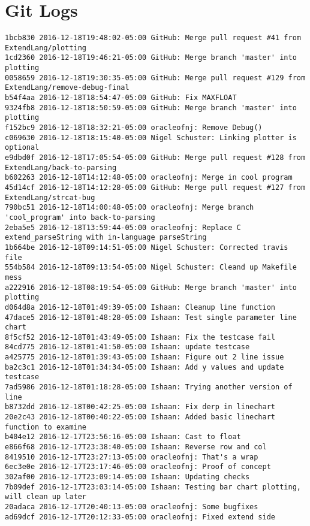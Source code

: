\medskip \noindent
\chapter{Git Logs}
\begin{lstlisting}
1bcb830 2016-12-18T19:48:02-05:00 GitHub: Merge pull request #41 from ExtendLang/plotting
1cd2360 2016-12-18T19:46:21-05:00 GitHub: Merge branch 'master' into plotting
0058659 2016-12-18T19:30:35-05:00 GitHub: Merge pull request #129 from ExtendLang/remove-debug-final
b54f4aa 2016-12-18T18:54:47-05:00 GitHub: Fix MAXFLOAT
9324fb8 2016-12-18T18:50:59-05:00 GitHub: Merge branch 'master' into plotting
f152bc9 2016-12-18T18:32:21-05:00 oracleofnj: Remove Debug()
c069630 2016-12-18T18:15:40-05:00 Nigel Schuster: Linking plotter is optional
e9dbd0f 2016-12-18T17:05:54-05:00 GitHub: Merge pull request #128 from ExtendLang/back-to-parsing
b602263 2016-12-18T14:12:48-05:00 oracleofnj: Merge in cool program
45d14cf 2016-12-18T14:12:28-05:00 GitHub: Merge pull request #127 from ExtendLang/strcat-bug
790bc51 2016-12-18T14:00:48-05:00 oracleofnj: Merge branch 'cool_program' into back-to-parsing
2eba5e5 2016-12-18T13:59:44-05:00 oracleofnj: Replace C extend_parseString with in-language parseString
1b664be 2016-12-18T09:14:51-05:00 Nigel Schuster: Corrected travis file
554b584 2016-12-18T09:13:54-05:00 Nigel Schuster: Cleand up Makefile mess
a222916 2016-12-18T08:19:54-05:00 GitHub: Merge branch 'master' into plotting
d064d8a 2016-12-18T01:49:39-05:00 Ishaan: Cleanup line function
47dace5 2016-12-18T01:48:28-05:00 Ishaan: Test single parameter line chart
8f5cf52 2016-12-18T01:43:49-05:00 Ishaan: Fix the testcase fail
84cd775 2016-12-18T01:41:50-05:00 Ishaan: update testcase
a425775 2016-12-18T01:39:43-05:00 Ishaan: Figure out 2 line issue
ba2c3c1 2016-12-18T01:34:34-05:00 Ishaan: Add y values and update testcase
7ad5986 2016-12-18T01:18:28-05:00 Ishaan: Trying another version of line
b8732dd 2016-12-18T00:42:25-05:00 Ishaan: Fix derp in linechart
20e2c43 2016-12-18T00:40:22-05:00 Ishaan: Added basic linechart function to examine
b404e12 2016-12-17T23:56:16-05:00 Ishaan: Cast to float
e866f68 2016-12-17T23:38:40-05:00 Ishaan: Reverse row and col
8419510 2016-12-17T23:27:13-05:00 oracleofnj: That's a wrap
6ec3e0e 2016-12-17T23:17:46-05:00 oracleofnj: Proof of concept
302af00 2016-12-17T23:09:14-05:00 Ishaan: Updating checks
7b09def 2016-12-17T23:03:14-05:00 Ishaan: Testing bar chart plotting, will clean up later
20adaca 2016-12-17T20:40:13-05:00 oracleofnj: Some bugfixes
ad69dcf 2016-12-17T20:12:33-05:00 oracleofnj: Fixed extend side

\end{lstlisting}

